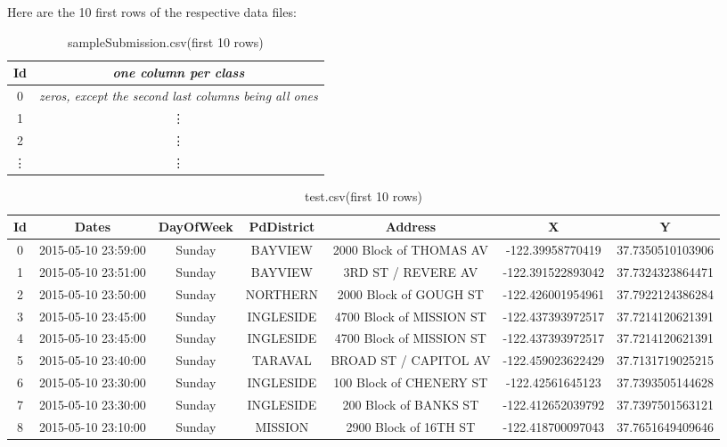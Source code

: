 \documentclass[titlepage,12pt]{article}
\begin{document}
Here are the 10 first rows of the respective data files:

\begin{table}[htbp]
\centering
\setlength\tabcolsep{2pt}
\begin{tabular}{|cc|}\hline
Id&\textit{one column per class}\\\hline\hline
0&\textit{zeros, except the second last columns being all ones}\\
1&\vdots\\
2&\vdots\\
\vdots&\vdots\\\hline
\end{tabular}
\caption{sampleSubmission.csv(first 10 rows)}
\label{tab:sampleSubmission.csv}
\end{table}

\begin{table}[htbp]
\centering
\scriptsize
\setlength\tabcolsep{2pt}
\begin{tabular}{|ccccccc|}\hline
Id&Dates&DayOfWeek&PdDistrict&Address&X&Y\\\hline\hline
0&2015-05-10 23:59:00&Sunday&BAYVIEW&2000 Block of THOMAS AV&-122.39958770419&37.7350510103906\\
1&2015-05-10 23:51:00&Sunday&BAYVIEW&3RD ST / REVERE AV&-122.391522893042&37.7324323864471\\
2&2015-05-10 23:50:00&Sunday&NORTHERN&2000 Block of GOUGH ST&-122.426001954961&37.7922124386284\\
3&2015-05-10 23:45:00&Sunday&INGLESIDE&4700 Block of MISSION ST&-122.437393972517&37.7214120621391\\
4&2015-05-10 23:45:00&Sunday&INGLESIDE&4700 Block of MISSION ST&-122.437393972517&37.7214120621391\\
5&2015-05-10 23:40:00&Sunday&TARAVAL&BROAD ST / CAPITOL AV&-122.459023622429&37.7131719025215\\
6&2015-05-10 23:30:00&Sunday&INGLESIDE&100 Block of CHENERY ST&-122.42561645123&37.7393505144628\\
7&2015-05-10 23:30:00&Sunday&INGLESIDE&200 Block of BANKS ST&-122.412652039792&37.7397501563121\\
8&2015-05-10 23:10:00&Sunday&MISSION&2900 Block of 16TH ST&-122.418700097043&37.7651649409646\\\hline
\end{tabular}
\caption{test.csv(first 10 rows)}
\label{tab:test.csv}
\end{table}
\end{document}
